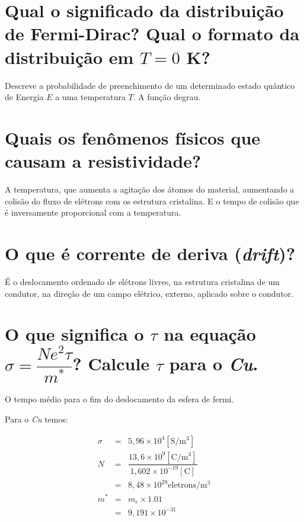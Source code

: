 \section*{Qual o significado da distribuição de Fermi-Dirac? Qual o
  formato da distribuição em $T = 0$ K?}
\label{q8}

Descreve a probabilidade de preenchimento de um determinado estado
quântico de Energia $E$ a uma temperatura $T$. A função degrau.

\section*{Quais os fenômenos físicos que causam a resistividade?}
\label{q9}

A temperatura, que aumenta a agitação dos átomos do material, aumentando a colisão
do fluxo de elétrons com os estrutura cristalina. E o tempo de colisão
que é inversamente proporcional com a temperatura.

\section*{O que é corrente de deriva (\emph{drift})?}
\label{q10}

É o deslocamento ordenado de elétrons livres, na estrutura cristalina
de um condutor, na direção de um campo elétrico, externo, aplicado
sobre o condutor.

\section*{O que significa o $\tau$ na equação $\sigma = \dfrac{Ne^{2}\tau}{m^{*}}$?
  Calcule $\tau$ para o \emph{Cu}.}
\label{q11}

O tempo médio para o fim do deslocamento da esfera de fermi.

\vspace*{0.5cm}

Para o \emph{Cu} temos:

\begin{eqnarray*}
  \sigma & = & 5,96 \times 10^{4} [\si{\siemens/\meter^{3}}]\\ \nonumber
  N & = & \dfrac{13,6 \times 10^{9} [\si{\coulomb/\meter^{3}}]}
          {1,602 \times 10^{-19}[\si{\coulomb}]} \\ \nonumber
  & = & 8,48 \times 10^{28} \mathrm{eletrons}/\si{\meter^{3}} \\ \nonumber
  m^{*} & = & m_{e} \times 1.01 \\ \nonumber
  & = & 9,191 \times 10^{-31} \nonumber
\end{eqnarray*}

